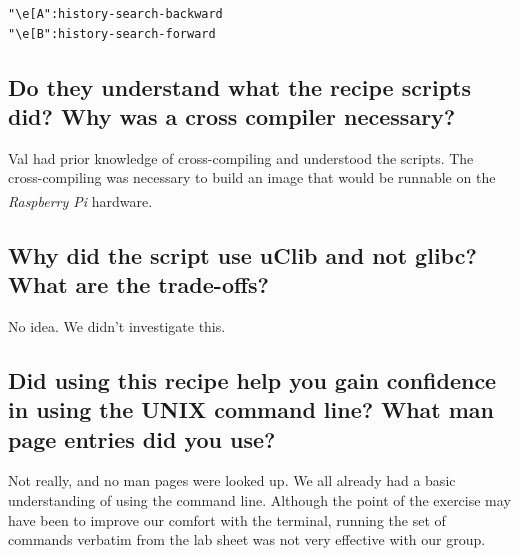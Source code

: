 \documentclass[11pt,a4paper,titlepage]{report}
\newcommand{\rpi}{\textit{Raspberry Pi\textsuperscript{\textregistered}}}
\begin{document}
\begin{appendices}
\begin{lstlisting}[frame=single]
"\e[A":history-search-backward
"\e[B":history-search-forward
\end{lstlisting}

\subsection*{Do they understand what the recipe scripts did? Why was a cross compiler 
necessary?}

Val had prior knowledge of cross-compiling and understood the scripts. The cross-compiling was necessary to build an image that would be runnable on the \rpi\xspace hardware.

\subsection*{Why did the script use uClib and not glibc? What are the trade-offs?}

No idea. We didn't investigate this.

\subsection*{Did using this recipe help you gain confidence in using the UNIX command 
line? What man page entries did you use? }

Not really, and no man pages were looked up. We all already had a basic understanding of using the command line. Although the point of the exercise may have been to improve our comfort with the terminal, running the set of commands verbatim from the lab sheet was not very effective with our group.

\end{appendices}




\nocite{*}
\printbibliography[heading=bibintoc]
\end{document}
